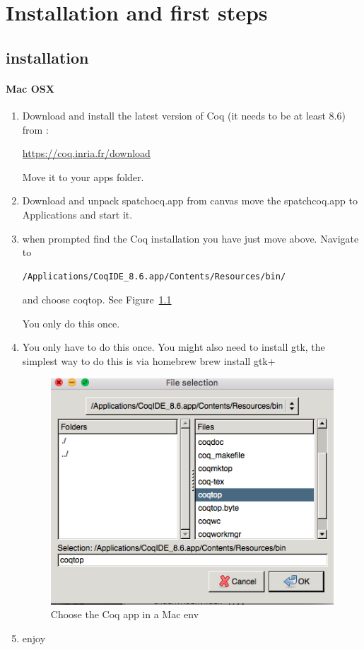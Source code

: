 

\part{ Installation and first steps }
\chapter{installation}
\subsection{Mac OSX}
\begin{enumerate}
\item Download and install  the latest version of Coq (it needs to be at least 8.6) from :

\href{https://coq.inria.fr/download}{https://coq.inria.fr/download}

Move it to your apps folder.


\item  Download and unpack spatchocq.app from canvas
move the spatchcoq.app to Applications and start it. 

\item when prompted find the Coq installation you have just move above. Navigate to 
\begin{verbatim}
/Applications/CoqIDE_8.6.app/Contents/Resources/bin/
\end{verbatim}
and choose coqtop. See Figure~\ref{fig:macos}

You only do this once.
\item  You only have to do this once. You might also need to install gtk, the simplest way to do this is  via homebrew
{\center brew install gtk+}
\begin{figure}\label{fig:macos}
\center
\includegraphics[scale=0.5]{Installation/macos.png}
\caption{Choose the Coq app in a Mac env}\label{fig:macos}
\end{figure}
\item enjoy

\end{enumerate}

